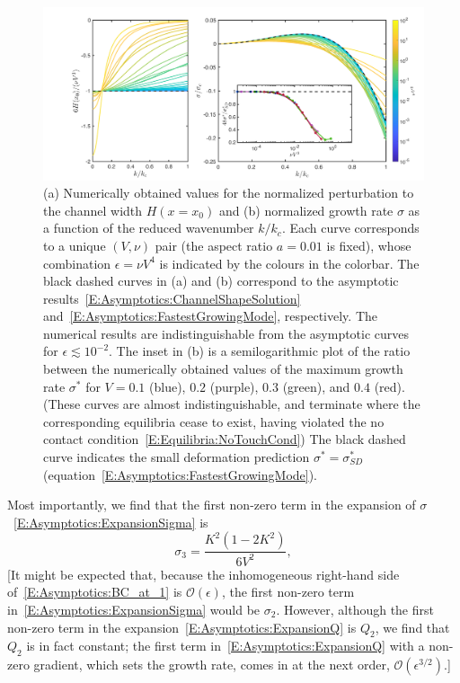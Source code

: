 \documentclass{jfm}
\newcommand{\order}[1]{\mathcal{O}\left(#1\right)}
\begin{document}
\begin{figure}
\centering
\includegraphics[width = \textwidth]{figures/fig8_asymptotics.pdf}
\caption{(a) Numerically obtained values for the normalized perturbation to the channel width $H(x = x_0)$ and (b) normalized growth rate $\sigma$ as a function of the reduced wavenumber $k/k_c$. Each curve corresponds to a unique $(V,\nu)$ pair (the aspect ratio $a = 0.01$ is fixed), whose combination $\epsilon = \nu V^4$ is indicated by the colours in the colorbar. The black dashed curves in (a) and (b) correspond to the asymptotic results~\eqref{E:Asymptotics:ChannelShapeSolution} and~\eqref{E:Asymptotics:FastestGrowingMode}, respectively. The numerical results are indistinguishable from the asymptotic curves for $\epsilon \lesssim 10^{-2}$. The inset in (b) is a semilogarithmic plot of the ratio between the numerically obtained values of the maximum growth rate $\sigma^*$ for $V = 0.1$ (blue), $0.2$ (purple), $0.3$ (green), and $0.4$ (red). (These curves are almost indistinguishable, and terminate where the corresponding equilibria cease to exist, having violated the no contact condition~\eqref{E:Equilibria:NoTouchCond}) The black dashed curve indicates the small deformation prediction $\sigma^* = \sigma^*_{SD}$ (equation~\eqref{E:Asymptotics:FastestGrowingMode}).}
\label{fig:CollapsedGrowthRates}
\end{figure}


Most importantly, we find that the first non-zero term in the expansion of $\sigma$~\eqref{E:Asymptotics:ExpansionSigma} is
\begin{equation}\label{E:Asymptotics:LeadingOrderSigma}
\sigma_{3} = \frac{K^2\left(1-2K^2\right)}{6V^2},
\end{equation}
[It might be expected that, because the inhomogeneous right-hand side of~\eqref{E:Asymptotics:BC_at_1} is $\order{\epsilon}$, the first non-zero term in~\eqref{E:Asymptotics:ExpansionSigma} would be $\sigma_2$. However, although 
the first non-zero term in the expansion~\eqref{E:Asymptotics:ExpansionQ} is $Q_{2}$, we find that $Q_{2}$ is in fact constant; the first term in~\eqref{E:Asymptotics:ExpansionQ} with a non-zero gradient, which sets the growth rate, comes in at the next order, $\mathcal{O}(\epsilon^{3/2})$.]
\end{document}
